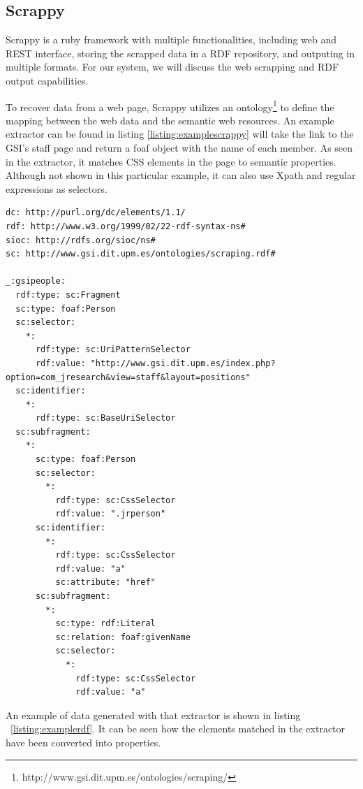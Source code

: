 
\subsection{Scrappy}
\label{subsec:scrappy}

Scrappy\cite{villamor13} is a ruby framework with multiple functionalities, including web and REST interface, storing the scrapped data in a RDF repository, and outputing in multiple formats. For our system, we will discuss the web scrapping and RDF output capabilities.

To recover data from a web page, Scrappy utilizes an ontology\footnote{http://www.gsi.dit.upm.es/ontologies/scraping/} to define the mapping between the web data and the semantic web resources. An example extractor can be found in listing \ref{listing:examplescrappy} will take the link to the GSI's staff page and return a foaf object with the name of each member. As seen in the extractor, it matches CSS elements in the page to semantic properties. Although not shown in this particular example, it can also use Xpath and regular expressions as selectors.

\begin{center} 
  \begin{lstlisting}[language={}, captionpos=b, caption=Example extractor, label=listing:examplescrappy]   
dc: http://purl.org/dc/elements/1.1/
rdf: http://www.w3.org/1999/02/22-rdf-syntax-ns#
sioc: http://rdfs.org/sioc/ns#
sc: http://www.gsi.dit.upm.es/ontologies/scraping.rdf#

_:gsipeople:
  rdf:type: sc:Fragment
  sc:type: foaf:Person
  sc:selector:
    *:
      rdf:type: sc:UriPatternSelector
      rdf:value: "http://www.gsi.dit.upm.es/index.php?option=com_jresearch&view=staff&layout=positions"
  sc:identifier:
    *:
      rdf:type: sc:BaseUriSelector
  sc:subfragment:
    *:
      sc:type: foaf:Person
      sc:selector:
        *:
          rdf:type: sc:CssSelector
          rdf:value: ".jrperson"
      sc:identifier:
        *:
          rdf:type: sc:CssSelector
          rdf:value: "a"
          sc:attribute: "href"
      sc:subfragment:
        *:
          sc:type: rdf:Literal
          sc:relation: foaf:givenName
          sc:selector:
            *:
              rdf:type: sc:CssSelector
              rdf:value: "a"
  \end{lstlisting}
\end{center}

An example of data generated with that extractor is shown in listing ~\ref{listing:examplerdf}. It can be seen how the elements matched in the extractor have been converted into properties. 

